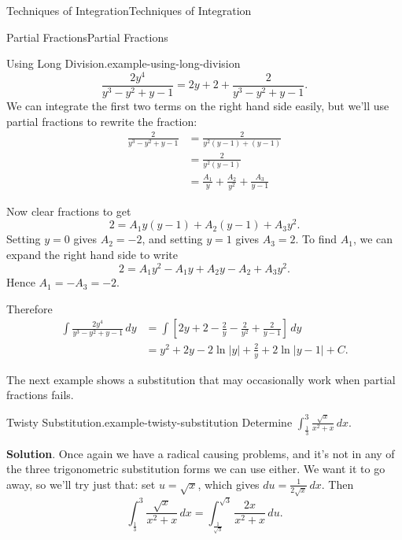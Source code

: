 \documentclass[10pt,]{book}
\numberwithin{equation}{section}
\begin{document}
\begin{chapterptx}{Techniques of Integration}{}{Techniques of Integration}{}{}
\begin{sectionptx}{Partial Fractions}{}{Partial Fractions}{}{}
\begin{example}{Using Long Division.}{example-using-long-division}
\begin{equation*}
\frac{2y^{4}}{y^{3} - y^{2} + y - 1} = 2y + 2 + \frac{2}{y^{3} - y^{2} + y - 1}.
\end{equation*}
We can integrate the first two terms on the right hand side easily, but we'll use partial fractions to rewrite the fraction:%
\begin{align*}
\frac{2}{y^{3} - y^{2} + y - 1} & = \frac{2}{y^{2}(y - 1) + (y - 1)} \\
& = \frac{2}{y^{2}(y - 1)} \\
& = \frac{A_{1}}{y} + \frac{A_{2}}{y^{2}} + \frac{A_{3}}{y - 1} 
\end{align*}
%
\par
\hypertarget{p-569}{}%
Now clear fractions to get%
\begin{equation*}
2 = A_{1}y(y-1) + A_{2}(y-1) + A_{3}y^{2}.
\end{equation*}
Setting \(y = 0\) gives \(A_{2} = -2\), and setting \(y = 1\) gives \(A_{3} = 2\). To find \(A_{1}\), we can expand the right hand side to write%
\begin{equation*}
2 = A_{1}y^{2} - A_{1}y + A_{2}y - A_{2} + A_{3}y^{2}.
\end{equation*}
Hence \(A_{1} = -A_{3} = -2\).%
\par
\hypertarget{p-570}{}%
Therefore%
\begin{align*}
\int\frac{2y^{4}}{y^{3} - y^{2} + y - 1}\,dy & = \int\left[2y + 2 - \frac{2}{y} - \frac{2}{y^{2}} + \frac{2}{y - 1}\right]\,dy  \\
& = y^{2} + 2y - 2\ln|y| + \frac{2}{y} + 2\ln|y-1| + C. 
\end{align*}
%
\end{example}
\hypertarget{p-571}{}%
The next example shows a substitution that may occasionally work when partial fractions fails.%
\begin{example}{Twisty Substitution.}{example-twisty-substitution}%
\hypertarget{p-572}{}%
Determine \(\int_{\frac{1}{3}}^{3}\frac{\sqrt{x}}{x^{2} + x}\,dx.\)%
\par\smallskip%
\noindent\textbf{Solution}.\hypertarget{solution-125}{}\quad%
\hypertarget{p-573}{}%
Once again we have a radical causing problems, and it's not in any of the three trigonometric substitution forms we can use either. We want it to go away, so we'll try just that: set \(u = \sqrt{x}\), which gives \(du = \frac{1}{2\sqrt{x}}\,dx\). Then%
\begin{equation*}
\int_{\frac{1}{3}}^{3}\frac{\sqrt{x}}{x^{2} + x}\,dx = \int_{\frac{1}{\sqrt{3}}}^{\sqrt{3}}\frac{2x}{x^{2} + x}\,du.

\end{equation*}
\end{example}
\end{sectionptx}
\end{chapterptx}
\end{document}
